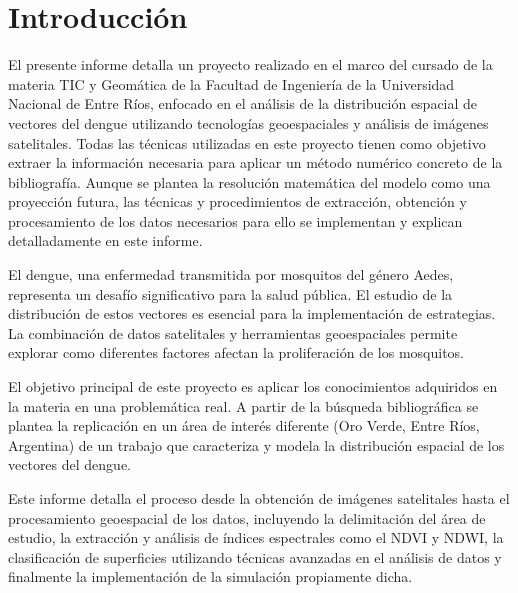 \section{Introducción}

El presente informe detalla un proyecto realizado en el marco del cursado de la materia TIC y Geomática de la Facultad de Ingeniería de la Universidad Nacional de Entre Ríos, enfocado en el análisis de la distribución espacial de vectores del dengue utilizando tecnologías geoespaciales y análisis de imágenes satelitales. Todas las técnicas utilizadas en este proyecto tienen como objetivo extraer la información necesaria para aplicar un método numérico concreto de la bibliografía. Aunque se plantea la resolución matemática del modelo como una proyección futura, las técnicas y procedimientos de extracción, obtención y procesamiento de los datos necesarios para ello se implementan y explican detalladamente en este informe.

El dengue, una enfermedad transmitida por mosquitos del género Aedes, representa un desafío significativo para la salud pública. El estudio de la distribución de estos vectores es esencial para la implementación de estrategias. La combinación de datos satelitales y herramientas geoespaciales permite explorar como diferentes factores afectan la proliferación de los mosquitos.

El objetivo principal de este proyecto es aplicar los conocimientos adquiridos en la materia en una problemática real. A partir de la búsqueda bibliográfica se plantea la replicación en un área de interés diferente (Oro Verde, Entre Ríos, Argentina) de un trabajo que caracteriza y modela la distribución espacial de los vectores del dengue.

Este informe detalla el proceso desde la obtención de imágenes satelitales hasta el procesamiento geoespacial de los datos, incluyendo la delimitación del área de estudio, la extracción y análisis de índices espectrales como el NDVI y NDWI, la clasificación de superficies utilizando técnicas avanzadas en el análisis de datos y finalmente la implementación de la simulación propiamente dicha.